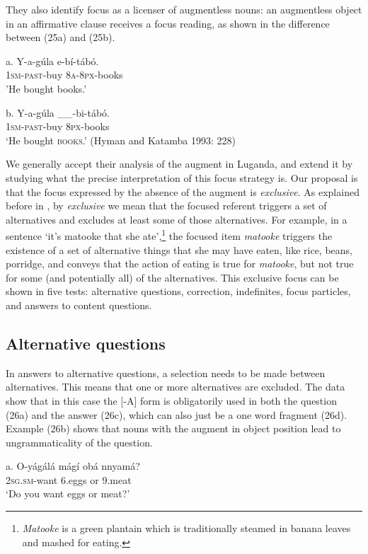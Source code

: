 \documentclass[output=paper]{langsci/langscibook}
\begin{document}
They also identify focus as a licenser of augmentless nouns: an augmentless object in an affirmative clause receives a focus reading, as shown in the difference between (25a) and (25b).

\ea
\gll a.  Y-a-gúla    e-bí-tábó.\\
       \textsc{1sm}-\textsc{past}-buy  \textsc{8a}-\textsc{8px}-books\\
\glt   'He bought books.'
\z

\ea
\gll b.  Y-a-gúla    \_\_-bi-tábó.\\
       \textsc{1sm}-\textsc{past}-buy       \textsc{8px}-books\\
\glt   ‘He bought \textsc{books}.’ (Hyman and Katamba 1993: 228)
\z

We generally accept their analysis of the augment in Luganda, and extend it by studying what the precise interpretation of this focus strategy is. Our proposal is that the focus expressed by the absence of the augment is \textit{exclusive}. As explained before in , by \textit{exclusive} we mean that the focused referent triggers a set of alternatives and excludes at least some of those alternatives. For example, in a sentence ‘it’s matooke that she ate’,\footnote{\textit{Matooke} is a green plantain which is traditionally steamed in banana leaves and mashed for eating. } {} the focused item \textit{matooke} triggers the existence of a set of alternative things that she may have eaten, like rice, beans, porridge, and conveys that the action of eating is true for \textit{matooke}, but not true for some (and potentially all) of the alternatives. This exclusive focus can be shown in five tests: alternative questions, correction, indefinites, focus particles, and answers to content questions.

\subsection{Alternative questions} %

In answers to alternative questions, a selection needs to be made between alternatives. This means that one or more alternatives are excluded. The data show that in this case the [-A] form is obligatorily used in both the question (26a) and the answer (26c), which can also just be a one word fragment (26d). Example (26b) shows that nouns with the augment in object position lead to ungrammaticality of the question. 

\ea
\gll   a.  O-yágálá    mágí    obá  nnyamá?\\
         \textsc{2sg}.\textsc{sm}-want    6.eggs    or  9.meat \\
\glt     ‘Do you want eggs or meat?’
\z
\end{document}

